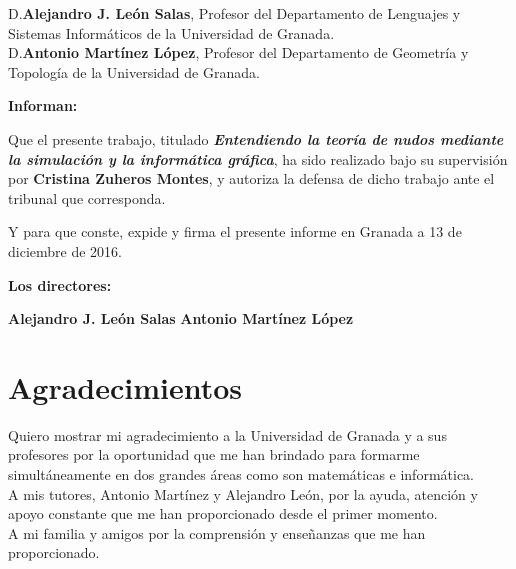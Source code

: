 D.\textbf{Alejandro J. León Salas}, Profesor del Departamento de Lenguajes y Sistemas Informáticos de la Universidad de Granada.\\

D.\textbf{Antonio Martínez López}, Profesor del Departamento de Geometría y Topología de la Universidad de Granada.\\

\vspace{0.5cm}

\textbf{Informan:}

\vspace{0.5cm}

Que el presente trabajo, titulado \textit{\textbf{Entendiendo la teoría de nudos mediante la simulación y la informática gráfica}},
ha sido realizado bajo su supervisión por \textbf{Cristina Zuheros Montes}, y autoriza la defensa de dicho trabajo ante el tribunal
que corresponda.

\vspace{0.5cm}

Y para que conste, expide y firma el presente informe en Granada a 13 de diciembre de 2016.

\vspace{1cm}

\textbf{Los directores:}

\vspace{5cm}

\noindent \textbf{Alejandro J. León Salas} \hspace{7cm} \textbf{Antonio Martínez López}

\chapter*{Agradecimientos}
\thispagestyle{empty}

\vspace{0.5cm}
 
 Quiero mostrar mi agradecimiento a la Universidad de Granada y a sus profesores por la oportunidad que me han brindado para formarme simultáneamente en dos grandes áreas como son matemáticas e informática. \\
 
 A mis tutores, Antonio Martínez y Alejandro León, por la ayuda, atención y apoyo constante que me han proporcionado desde el primer momento.\\
 
 A mi familia y amigos por la comprensión y enseñanzas que me han proporcionado. 
 
